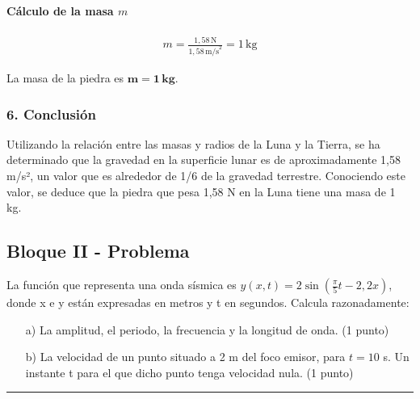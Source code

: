 \paragraph{Cálculo de la masa $m$}
\begin{gather}
    m = \frac{1,58 \, \text{N}}{1,58 \, \text{m/s}^2} = 1 \, \text{kg}
\end{gather}
\begin{cajaresultado}
    La masa de la piedra es $\boldsymbol{m = 1 \, \textbf{kg}}$.
\end{cajaresultado}

\subsubsection*{6. Conclusión}
\begin{cajaconclusion}
Utilizando la relación entre las masas y radios de la Luna y la Tierra, se ha determinado que la gravedad en la superficie lunar es de aproximadamente 1,58 m/s², un valor que es alrededor de 1/6 de la gravedad terrestre. Conociendo este valor, se deduce que la piedra que pesa 1,58 N en la Luna tiene una masa de 1 kg.
\end{cajaconclusion}

\newpage
\subsection{Bloque II - Problema}
\label{subsec:B2_2014_jun_ord}

\begin{cajaenunciado}
La función que representa una onda sísmica es $y(x,t) = 2 \sin(\frac{\pi}{5}t - 2,2x)$, donde x e y están expresadas en metros y t en segundos. Calcula razonadamente:
\begin{enumerate}
    \item[a)] La amplitud, el periodo, la frecuencia y la longitud de onda. (1 punto)
    \item[b)] La velocidad de un punto situado a 2 m del foco emisor, para $t=10$ s. Un instante t para el que dicho punto tenga velocidad nula. (1 punto)
\end{enumerate}
\end{cajaenunciado}
\hrule

